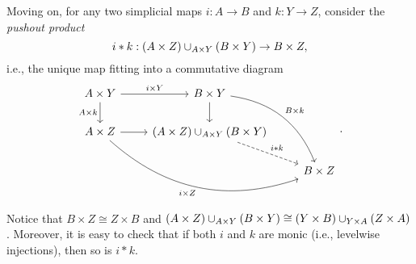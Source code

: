 \documentclass[10pt,letterpaper,cm]{nupset}
\theoremstyle{definition}
\theoremstyle{theorem}
\theoremstyle{remark}
\newcommand{\0}{\mathbf{0}}
\newcommand{\1}{\mathbf{1}}
\newcommand{\2}{\mathbf{2}}
\begin{document}
Moving on, for any two simplicial maps $i : A \to B$ and $k : Y \to Z$, consider the \textit{pushout product} 
\[
i \mathbin{\ast} k  : \mleft(A \times Z\mright) \cup_{A\times Y} \mleft(B \times Y \mright) \to B \times Z,
\] i.e., the unique map fitting into a commutative diagram
\[
\begin{tikzcd}
A\times Y \arrow[d, "A\times k"'] \arrow[r, "i\times Y"]  & B\times Y \arrow[d] \arrow[rdd, "B\times k", bend left]                                                   &           \\
A\times Z \arrow[r] \arrow[rrd, "i\times Z"', bend right] &  \mleft(A \times Z\mright) \cup_{A\times Y} \mleft(B \times Y \mright) \arrow[rd, "i\mathbin{\ast}k", dashed] &           \\
                                                          &                                                                                                           & B\times Z
\end{tikzcd}
.\]
Notice that $B\times Z \cong Z \times B$ and $\mleft(A \times Z\mright) \cup_{A\times Y} \mleft(B \times Y \mright) \cong \mleft(Y \times B\mright) \cup_{Y\times A} \mleft(Z \times A\mright)$. Moreover, it is easy to check that if both $i$ and $k$ are monic (i.e., levelwise injections), then so is $i \mathbin{\ast} k$.
\end{document}
